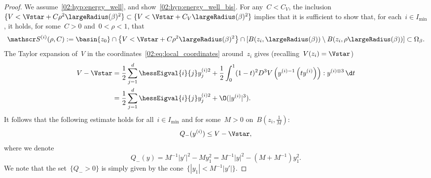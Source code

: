             \begin{proof}
                We assume~\eqref{02:hyp:energy_well}, and show~\eqref{02:hyp:energy_well_bis}.
                For any~$C<C_V$, the inclusion~$\{V<\Vstar + C\rho^2\largeRadius(\beta)^2\}\subset \{V<\Vstar + C_V\largeRadius(\beta)^2\}$ implies that it is sufficient to show that, for each~$i\in I_{\min}$, it holds, for some~$C>0$ and~$0<\rho<1$, that
                \begin{equation}
                \label{02:eq:delta_reduction_inclusion}
                \mathscr S^{(i)}(\rho,C):=\basin{z_0}\cap\left\{V<\Vstar+C \rho^2\largeRadius(\beta)^2\right\}\cap\left[B(z_i,\largeRadius(\beta))\setminus B(z_i,\rho\largeRadius(\beta))\right]\subset \Omega_\beta.
                \end{equation}
                The Taylor expansion of~$V$ in the coordinates~\eqref{02:eq:local_coordinates} around~$z_i$ gives (recalling~$V(z_i)=\Vstar$)
                \begin{equation}
                    \label{02:eq:V_local}
                    \begin{split}
                        V - \Vstar &= \frac12\sum_{j=1}^d \hessEigval{i}{j}y^{(i)2}_j + \frac12 \int_0^1 (1-t)^2 D^3 V\left(y^{(i)-1}\left(ty^{(i)}\right)\right):y^{(i)\otimes 3}\,\d t \\
                        &= \frac12\sum_{j=1}^d \hessEigval{i}{j}y^{(i)2}_j + \O(|y^{(i)}|^3).
                    \end{split}
                    \end{equation}
                    It follows that the following estimate holds for all~$i\in I_{\min}$ and for some~$M>0$ on~$B(z_i,\frac1M)$:
                    \begin{equation}
                        \label{02:eq:quadratic_estimate}
                        Q_{-}(y^{(i)}) \leq V-\Vstar,%
                    \end{equation}
                    where we denote
                    \begin{equation}
                        \label{02:eq:quadratic_forms}
                        Q_{-}(y) = M^{- 1}|y'|^2 - M y_1^2 = M^{-1}|y|^2 - (M+M^{-1})y_1^2.
                    \end{equation}
                    We note that the set~$\{Q_{-}>0\}$ is simply given by the cone~$\{|y_1| <  M^{-1}|y'|\}$.


\end{proof}
